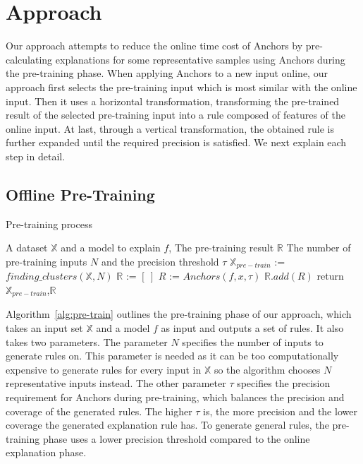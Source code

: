 \section{Approach}


Our approach attempts to reduce the online time cost of Anchors by pre-calculating explanations for some representative samples using Anchors during the pre-training phase. When applying Anchors to a new input online, our approach first selects the pre-training input which is most similar with the online input. Then it uses a horizontal transformation, transforming the pre-trained result of the selected pre-training input into a rule composed of features of the online input. At last, through a vertical transformation, the obtained rule is further expanded until the required precision is satisfied. We next explain each step in detail.

\subsection{Offline Pre-Training} 

\begin{algorithm}[tb]
   \caption{Pre-training process}
   \label{alg:pre-train}
    \begin{algorithmic}[1]
     A dataset $\mathbb{X}$ and a model to explain $f$, 
     The pre-training result $\mathbb{R}$
     The number of pre-training inputs $N$ and the precision threshold $\tau$
    \STATE $\mathbb{X}_{pre-train}$ := $finding\_clusters(\mathbb{X},N)$
    \STATE $\mathbb{R}$ := $[\ ]$
        \STATE $R$ := $Anchors(f,x,\tau)$
        \STATE $\mathbb{R}.add(R)$
    \ENDFOR
    \STATE return $\mathbb{X}_{pre-train}$,$\mathbb{R}$
    \end{algorithmic}
\end{algorithm}

Algorithm~\ref{alg:pre-train} outlines the pre-training phase of our approach, which takes an input set $\mathbb{X}$ and a model $f$ as input and outputs a set of rules.
%
It also takes two parameters.
The parameter $N$ specifies the number of inputs to generate rules on.
This parameter is needed as it can be too computationally expensive to generate rules for every input in $\mathbb{X}$ so the algorithm chooses $N$ representative inputs instead.
The other parameter $\tau$ specifies the precision requirement for Anchors during  pre-training, which balances the precision and coverage of the generated rules.
The higher $\tau$ is, the more precision and the lower coverage the generated explanation rule has. 
To generate general rules, the pre-training phase uses a lower precision threshold compared to the online explanation phase.

